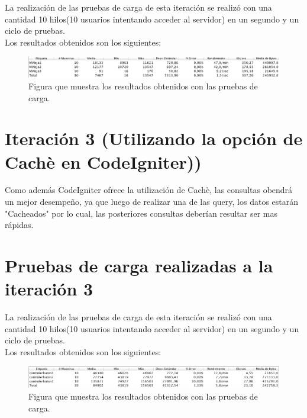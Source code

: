  La realización de las pruebas de carga de esta iteración se realizó con una cantidad 10 hilos(10 usuarios intentando acceder al servidor)
 en un segundo y un ciclo de pruebas.\\
 
 Los resultados obtenidos son los siguientes:
 
 \begin{figure}[htb]
 	\label{Figura12}
 	\begin{center}
 		\includegraphics[scale=0.7]{imagenes/iteracion1-mviejaOpSql.png}
 		\caption{Figura que muestra los resultados obtenidos con las pruebas de carga.}
 	\end{center}
 \end{figure}
 
 \section{Iteración 3 (Utilizando la opción de Cachè en CodeIgniter))}
 
 Como además CodeIgniter ofrece la utilización de Cachè, las consultas obendrá un mejor desempeño, ya que luego de realizar una de las query, los datos estarán "Cacheados" por lo cual, las posteriores consultas deberían resultar ser mas rápidas. 
 
 \section{Pruebas de carga realizadas a la iteración 3}
 
 La realización de las pruebas de carga de esta iteración se realizó con una cantidad 10 hilos(10 usuarios intentando acceder al servidor)
 en un segundo y un ciclo de pruebas.\\
 
 Los resultados obtenidos son los siguientes:
 
 \begin{figure}[htb]
 	\label{Figura13}
 	\begin{center}
 		\includegraphics[scale=0.7]{imagenes/iteracion2-codeigniter.png}
 		\caption{Figura que muestra los resultados obtenidos con las pruebas de carga.}
 	\end{center}
 \end{figure}
 
